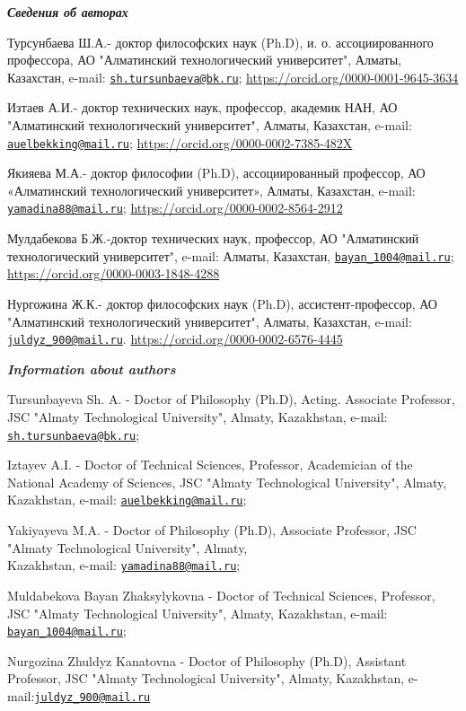 \begin{authorinfo}
\emph{{\bfseries Сведения об авторах}}

Турсунбаева Ш.А.- доктор философских наук (Ph.D), и. о. ассоциированного
профессора, АО "Алматинский технологический университет", Алматы,
Казахстан, e-mail:
\href{mailto:sh.tursunbaeva@bk.ru}{\nolinkurl{sh.tursunbaeva@bk.ru}};
\url{https://orcid.org/0000-0001-9645-3634}

Изтаев А.И.- доктор технических наук, профессор, академик НАН, АО
"Алматинский технологический университет", Алматы, Казахстан, e-mail:
\href{mailto:auelbekking@mail.ru}{\nolinkurl{auelbekking@mail.ru}};
\url{https://orcid.org/0000-0002-7385-482X}

Якияева М.А.- доктор философии (Ph.D), ассоциированный профессор, АО
«Алматинский технологический университет», Алматы, Казахстан, e-mail:
\href{mailto:yamadina88@mail.ru}{\nolinkurl{yamadina88@mail.ru}};
\url{https://orcid.org/0000-0002-8564-2912}

Мулдабекова Б.Ж.-доктор технических наук, профессор, АО "Алматинский
технологический университет", e-mail: Алматы, Казахстан,
\href{mailto:bayan_1004@mail.ru}{\nolinkurl{bayan\_1004@mail.ru}};
\url{https://orcid.org/0000-0003-1848-4288}

Нургожина Ж.К.- доктор философских наук (Ph.D), ассистент-профессор, АО
"Алматинский технологический университет", Алматы, Казахстан, e-mail:
\href{mailto:juldyz_900@mail.ru}{\nolinkurl{juldyz\_900@mail.ru}}.
\url{https://orcid.org/0000-0002-6576-4445}

\emph{{\bfseries Information about authors}}

Tursunbayeva Sh. A. - Doctor of Philosophy (Ph.D), Acting. Associate
Professor, JSC "Almaty Technological University", Almaty, Kazakhstan,
e-mail:
\href{mailto:sh.tursunbaeva@bk.ru}{\nolinkurl{sh.tursunbaeva@bk.ru}};

Iztayev A.I. - Doctor of Technical Sciences, Professor, Academician of
the National Academy of Sciences, JSC "Almaty Technological University",
Almaty, Kazakhstan, e-mail:
\href{mailto:auelbekking@mail.ru}{\nolinkurl{auelbekking@mail.ru}};

Yakiyayeva M.A. - Doctor of Philosophy (Ph.D), Associate Professor, JSC
"Almaty Technological University", Almaty, \\Kazakhstan, e-mail:
\href{mailto:yamadina88@mail.ru}{\nolinkurl{yamadina88@mail.ru}};

Muldabekova Bayan Zhaksylykovna - Doctor of Technical Sciences,
Professor, JSC "Almaty Technological University", Almaty, Kazakhstan,
e-mail:
\href{mailto:bayan_1004@mail.ru}{\nolinkurl{bayan\_1004@mail.ru}};

Nurgozina Zhuldyz Kanatovna - Doctor of Philosophy (Ph.D), Assistant
Professor, JSC "Almaty Technological University", Almaty, Kazakhstan,
e-mail:\href{mailto:juldyz_900@mail.ru}{\nolinkurl{juldyz\_900@mail.ru}}
\end{authorinfo}
